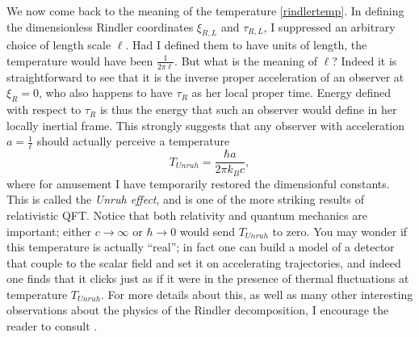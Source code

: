 \documentclass[12pt]{article}
\newcommand{\be}{\begin{equation}}
\newcommand{\ee}{\end{equation}}
\begin{document}
We now come back to the meaning of the temperature \eqref{rindlertemp}.  In defining the dimensionless Rindler coordinates $\xi_{R,L}$ and $\tau_{R,L}$, I suppressed an arbitrary choice of length scale $\ell$.  Had I defined them to have units of length, the temperature would have been $\frac{1}{2\pi \ell}$.  But what is the meaning of $\ell$?  Indeed it is straightforward to see that it is the inverse proper acceleration of an observer at $\xi_R=0$, who also happens to have $\tau_R$ as her local proper time.  Energy defined with respect to $\tau_R$ is thus the energy that such an observer would define in her locally inertial frame.  This strongly suggests that any observer with acceleration $a=\frac{1}{\ell}$  should actually perceive a temperature
\be\label{unruh}
T_{\mathit{Unruh}}=\frac{\hbar a}{2\pi k_B c},
\ee
where for amusement I have temporarily restored the dimensionful constants.  This is called the \textit{Unruh effect}, and is one of the more striking results of relativistic QFT.  Notice that both relativity and quantum mechanics are important; either $c\to\infty$ or $\hbar\to0$ would send $T_{\mathit{Unruh}}$ to zero.  You may wonder if this temperature is actually ``real''; in fact one can build a model of a detector that couple to the scalar field and set it on accelerating trajectories, and indeed one finds that it clicks just as if it were in the presence of thermal fluctuations at temperature $T_{\mathit{Unruh}}$.  For more details about this, as well as many other interesting observations about the physics of the Rindler decomposition, I encourage the reader to consult \cite{Unruh:1983ms}.
\end{document}
